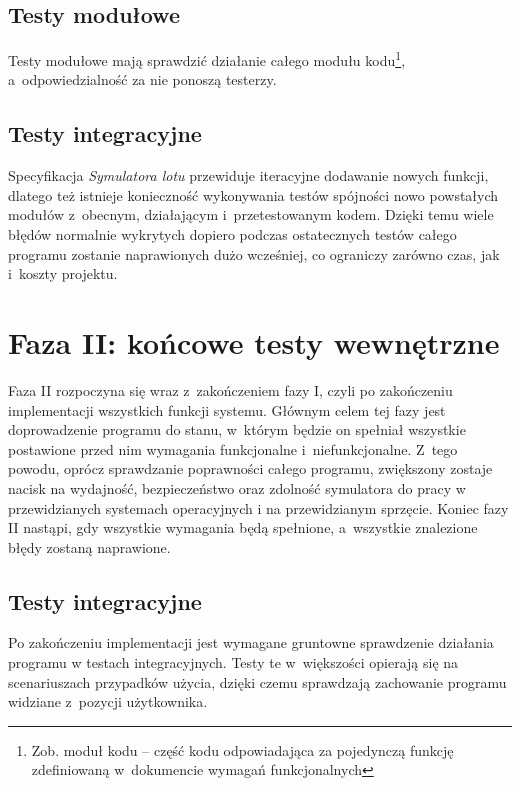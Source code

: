 \documentclass{mwrep}
\begin{document}
\section{Testy modułowe}
Testy modułowe mają sprawdzić działanie całego modułu kodu\footnote{Zob. moduł kodu -- część kodu odpowiadająca za pojedynczą funkcję zdefiniowaną w~dokumencie wymagań funkcjonalnych}, a~odpowiedzialność za nie ponoszą testerzy.

\section{Testy integracyjne}
Specyfikacja \textit{Symulatora lotu} przewiduje iteracyjne dodawanie nowych funkcji, dlatego też istnieje konieczność wykonywania testów spójności nowo powstałych modułów z~obecnym, działającym i~przetestowanym kodem. Dzięki temu wiele błędów normalnie wykrytych dopiero podczas ostatecznych testów całego programu zostanie naprawionych dużo wcześniej, co ograniczy zarówno czas, jak i~koszty projektu.

\chapter{Faza II: końcowe testy wewnętrzne}
Faza II rozpoczyna się wraz z~zakończeniem fazy I, czyli po zakończeniu implementacji wszystkich funkcji systemu. Głównym celem tej fazy jest doprowadzenie programu do stanu, w~którym będzie on spełniał wszystkie postawione przed nim wymagania funkcjonalne i~niefunkcjonalne. Z~tego powodu, oprócz sprawdzanie poprawności całego programu, zwiększony zostaje nacisk na wydajność, bezpieczeństwo oraz zdolność symulatora do pracy w przewidzianych systemach operacyjnych i na przewidzianym sprzęcie. Koniec fazy II nastąpi, gdy wszystkie wymagania będą spełnione, a~wszystkie znalezione błędy zostaną naprawione.

\section{Testy integracyjne}
Po zakończeniu implementacji jest wymagane gruntowne sprawdzenie działania programu w testach integracyjnych. Testy te w~większości opierają się na scenariuszach przypadków użycia, dzięki czemu sprawdzają zachowanie programu widziane z~pozycji użytkownika.
\end{document}
